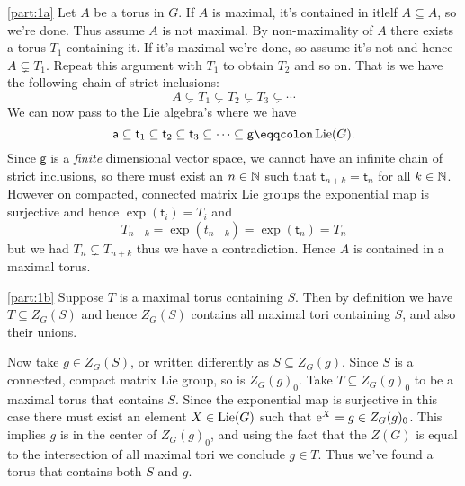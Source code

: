 \documentclass[
	pages,
	boxes,
	color=WildStrawberry
]{homework}
\begin{document}
\begin{solution}
	\ref{part:1a}
	Let $A$ be a torus in $G$. If $A$ is maximal, it's contained in itlelf $A\subseteq A$, so we're done. Thus assume $A$ is not maximal. By non-maximality of $A$ there exists a torus $T_1$ containing it. If it's maximal we're done, so assume it's not and hence $A\subsetneq T_1$. Repeat this argument with $T_1$ to obtain $T_2$ and so on. That is we have the following chain of strict inclusions:
	\begin{equation*}
		A\subsetneq T_1 \subsetneq T_2 \subsetneq T_3 \subsetneq \cdots
	\end{equation*}
	We can now pass to the Lie algebra's where we have
	\begin{equation*}
		\mathsf{a} \subseteq \mathsf{t}_1 \subseteq \mathsf{t}_2 \subseteq \mathsf{t}_3 \subseteq \cdots \subseteq \mathsf{g} \eqdef \Lie(G).
	\end{equation*}
	Since $\mathsf{g}$ is a \emph{finite} dimensional vector space, we cannot have an infinite chain of strict inclusions, so there must exist an $n\in \mathbb{N}$ such that $\mathsf{t}_{n + k} = \mathsf{t}_n$ for all $k\in \mathbb{N}$. However on compacted, connected matrix Lie groups the exponential map is surjective and hence $\exp(\mathsf{t}_i) = T_i$ and
	\begin{equation*}
		T_{n + k} = \exp(t_{n + k}) = \exp(\mathsf{t}_n) = T_n
	\end{equation*}
	but we had $T_{n} \subsetneq T_{n + k}$ thus we have a contradiction. Hence $A$ is contained in a maximal torus.

	\ref{part:1b}
	Suppose $T$ is a maximal torus containing $S$. Then by definition we have $T\subseteq Z_G(S)$ and hence $Z_G(S)$ contains all maximal tori containing $S$, and also their unions.

	Now take $g\in Z_G(S)$, or written differently as $S\subseteq Z_G(g)$. Since $S$ is a connected, compact matrix Lie group, so is $Z_G(g)_0$. Take $T\subseteq Z_G(g)_0$ to be a maximal torus that contains $S$. Since the exponential map is surjective in this case there must exist an element $X\in\operatorname{Lie}(G)$ such that $\mathrm{e}^{X} = g\in Z_G(g)_0$. This implies $g$ is in the center of $Z_G(g)_0$, and using the fact that the $Z(G)$ is equal to the intersection of all maximal tori we conclude $g\in T$. Thus we've found a torus that contains both $S$ and $g$.
\end{solution}
\end{document}
